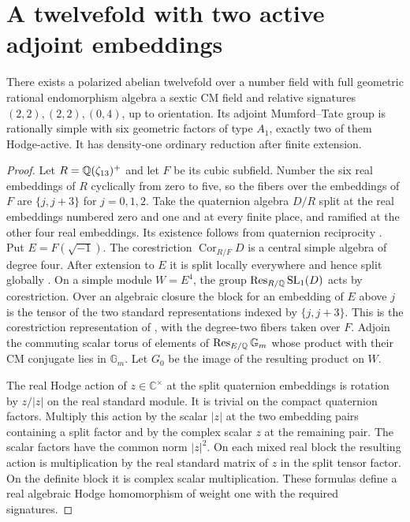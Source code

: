 \section{A twelvefold with two active adjoint embeddings}\label{sec:two-active}

\begin{proposition}\label{prop:two-active-twelvefold}
There exists a polarized abelian twelvefold over a number field with
full geometric rational endomorphism algebra a sextic CM field and
relative signatures \((2,2),(2,2),(0,4)\), up to orientation.
Its adjoint Mumford--Tate group is rationally simple with six
geometric factors of type \(A_1\), exactly two of them Hodge-active.
It has density-one ordinary reduction after finite extension.
\end{proposition}

\begin{proof}
Let \(R=\mathbb Q(\zeta_{13})^+\) and let \(F\) be its cubic subfield.
Number the six real embeddings of \(R\) cyclically from zero to five,
so the fibers over the embeddings of \(F\) are \(\{j,j+3\}\) for
\(j=0,1,2\). Take the quaternion algebra \(D/R\) split at the real
embeddings numbered zero and one and at every finite place, and
ramified at the other four real embeddings. Its existence follows
from quaternion reciprocity \cite[Theorem~14.6.1]{voight}.
Put \(E=F(\sqrt{-1})\). The corestriction
\(\operatorname{Cor}_{R/F}D\) is a central simple algebra of degree
four. After extension to \(E\) it is split locally everywhere and
hence split globally \cite[\S14.6]{voight}. On a simple module
\(W=E^4\), the group \(\operatorname{Res}_{R/\mathbb Q}\mathrm{SL}_1(D)\)
acts by corestriction. Over an algebraic closure the block for an
embedding of \(E\) above \(j\) is the tensor of the two standard
representations indexed by \(\{j,j+3\}\). This is the corestriction
representation of \cite[Example~3.1]{moonenclassification}, with
the degree-two fibers taken over \(F\). Adjoin the commuting scalar
torus of elements of \(\operatorname{Res}_{E/\mathbb Q}\mathbb G_m\) whose
product with their CM conjugate lies in \(\mathbb G_m\). Let \(G_0\)
be the image of the resulting product on \(W\).

The real Hodge action of \(z\in\mathbb C^\times\) at the split
quaternion embeddings is rotation by \(z/|z|\) on the real standard
module. It is trivial on the compact quaternion factors. Multiply
this action by the scalar \(|z|\) at the two embedding pairs
containing a split factor and by the complex scalar \(z\) at the
remaining pair. The scalar factors have the common norm \(|z|^2\).
On each mixed real block the resulting action is multiplication by
the real standard matrix of \(z\) in the split tensor factor. On the
definite block it is complex scalar multiplication. These formulas
define a real algebraic Hodge homomorphism of weight one with the
required signatures.


\end{proof}
